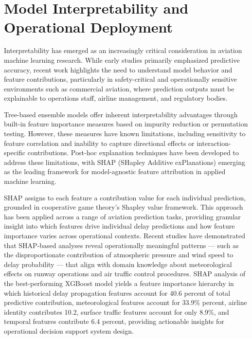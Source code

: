 \documentclass{report}
\begin{document}
\section{Model Interpretability and Operational Deployment}

Interpretability has emerged as an increasingly critical consideration in aviation machine learning research. While early studies primarily emphasized predictive accuracy, recent work highlights the need to understand model behavior and feature contributions, particularly in safety-critical and operationally sensitive environments such as commercial aviation, where prediction outputs must be explainable to operations staff, airline management, and regulatory bodies.

Tree-based ensemble models offer inherent interpretability advantages through built-in feature importance measures based on impurity reduction or permutation testing. However, these measures have known limitations, including sensitivity to feature correlation and inability to capture directional effects or interaction-specific contributions. Post-hoc explanation techniques have been developed to address these limitations, with SHAP (SHapley Additive exPlanations) emerging as the leading framework for model-agnostic feature attribution in applied machine learning.

SHAP assigns to each feature a contribution value for each individual prediction, grounded in cooperative game theory's Shapley value framework. This approach has been applied across a range of aviation prediction tasks, providing granular insight into which features drive individual delay predictions and how feature importance varies across operational contexts. Recent studies have demonstrated that SHAP-based analyses reveal operationally meaningful patterns --- such as the disproportionate contribution of atmospheric pressure and wind speed to delay probability --- that align with domain knowledge about meteorological effects on runway operations and air traffic control procedures. SHAP analysis of the best-performing XGBoost model yields a feature importance hierarchy in which historical delay propagation features account for 40.6 percent of total predictive contribution, meteorological features account for 33.9\% percent, airline identity contributes 10.2, surface traffic features account for only 8.9\%, and temporal features contribute 6.4 percent, providing actionable insights for operational decision support system design.
\end{document}
